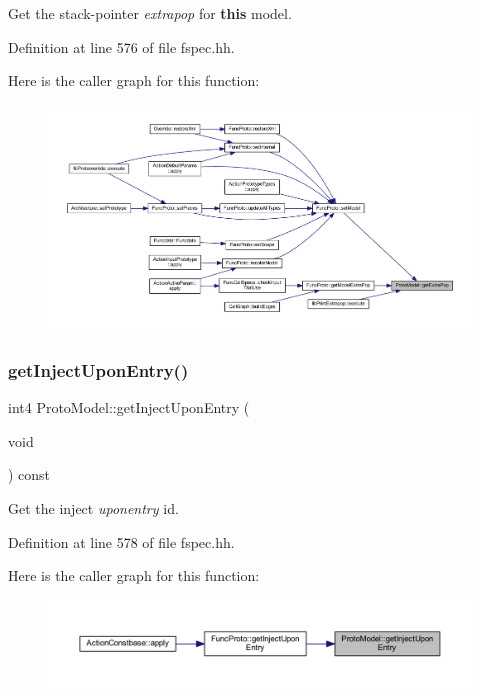 Get the stack-\/pointer {\itshape extrapop} for {\bfseries{this}} model. 



Definition at line 576 of file fspec.\+hh.

Here is the caller graph for this function\+:
\nopagebreak
\begin{figure}[H]
\begin{center}
\leavevmode
\includegraphics[width=350pt]{class_proto_model_a640ae87320b6d6781639643057e61e1d_icgraph}
\end{center}
\end{figure}
\mbox{\label{class_proto_model_af505f8d493ab0dcefca9e94941c13658}} 
\subsubsection{\texorpdfstring{getInjectUponEntry()}{getInjectUponEntry()}}
{\footnotesize\ttfamily int4 Proto\+Model\+::get\+Inject\+Upon\+Entry (\begin{DoxyParamCaption}\item[{void}]{ }\end{DoxyParamCaption}) const\hspace{0.3cm}{\ttfamily [inline]}}



Get the inject {\itshape uponentry} id. 



Definition at line 578 of file fspec.\+hh.

Here is the caller graph for this function\+:
\nopagebreak
\begin{figure}[H]
\begin{center}
\leavevmode
\includegraphics[width=350pt]{class_proto_model_af505f8d493ab0dcefca9e94941c13658_icgraph}
\end{center}
\end{figure}
\mbox{\label{class_proto_model_a2e8994c68acebcf5c0278d86be39a530}} 
